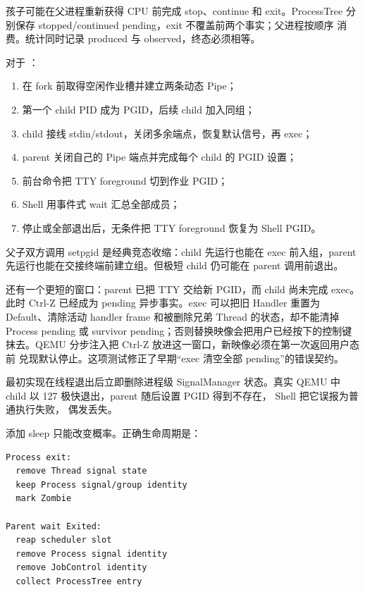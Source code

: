 孩子可能在父进程重新获得 CPU 前完成 stop、continue 和 exit。ProcessTree
分别保存 stopped/continued pending，exit 不覆盖前两个事实；父进程按顺序
消费。统计同时记录 produced 与 observed，终态必须相等。

对于 ：

\begin{enumerate}
  \item 在 fork 前取得空闲作业槽并建立两条动态 Pipe；
  \item 第一个 child PID 成为 PGID，后续 child 加入同组；
  \item child 接线 stdin/stdout，关闭多余端点，恢复默认信号，再 exec；
  \item parent 关闭自己的 Pipe 端点并完成每个 child 的 PGID 设置；
  \item 前台命令把 TTY foreground 切到作业 PGID；
  \item Shell 用事件式 wait 汇总全部成员；
  \item 停止或全部退出后，无条件把 TTY foreground 恢复为 Shell PGID。
\end{enumerate}

父子双方调用 setpgid 是经典竞态收缩：child 先运行也能在 exec 前入组，parent
先运行也能在交接终端前建立组。但极短 child 仍可能在 parent 调用前退出。

还有一个更短的窗口：parent 已把 TTY 交给新 PGID，而 child 尚未完成 exec。
此时 Ctrl-Z 已经成为 pending 异步事实。exec 可以把旧 Handler 重置为
Default、清除活动 handler frame 和被删除兄弟 Thread 的状态，却不能清掉
Process pending 或 survivor pending；否则替换映像会把用户已经按下的控制键
抹去。QEMU 分步注入把 Ctrl-Z 放进这一窗口，新映像必须在第一次返回用户态前
兑现默认停止。这项测试修正了早期“exec 清空全部 pending”的错误契约。

最初实现在线程退出后立即删除进程级 SignalManager 状态。真实 QEMU 中
 child 以 127 极快退出，parent 随后设置 PGID 得到不存在，
Shell 把它误报为普通执行失败， 偶发丢失。

添加 sleep 只能改变概率。正确生命周期是：

\begin{lstlisting}
Process exit:
  remove Thread signal state
  keep Process signal/group identity
  mark Zombie

Parent wait Exited:
  reap scheduler slot
  remove Process signal identity
  remove JobControl identity
  collect ProcessTree entry
\end{lstlisting}

